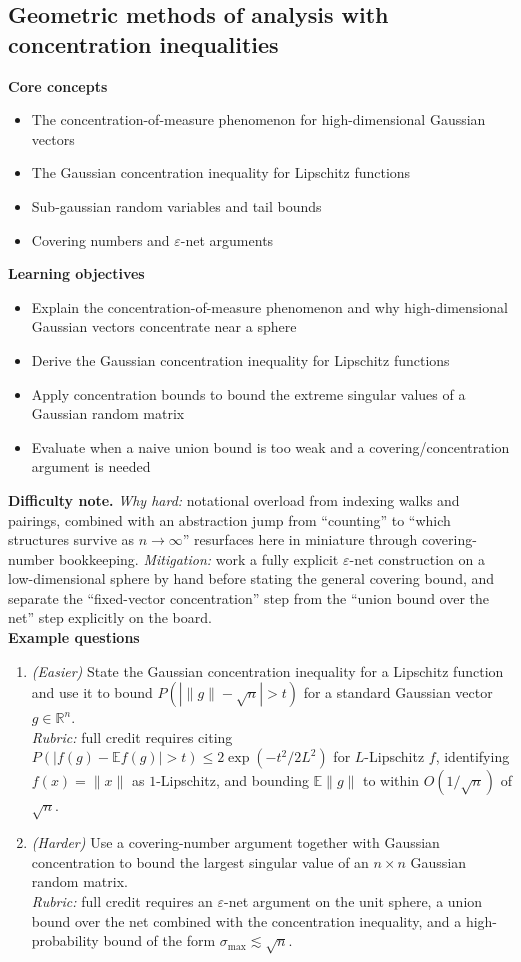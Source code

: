 \documentclass[11pt]{article}
\begin{document}
\subsection{Geometric methods of analysis with concentration inequalities}
\textbf{Core concepts}
\begin{itemize}[nosep]
\item The concentration-of-measure phenomenon for high-dimensional Gaussian vectors
\item The Gaussian concentration inequality for Lipschitz functions
\item Sub-gaussian random variables and tail bounds
\item Covering numbers and $\varepsilon$-net arguments
\end{itemize}
\textbf{Learning objectives}
\begin{itemize}[nosep]
\item Explain the concentration-of-measure phenomenon and why high-dimensional Gaussian vectors concentrate near a sphere
\item Derive the Gaussian concentration inequality for Lipschitz functions
\item Apply concentration bounds to bound the extreme singular values of a Gaussian random matrix
\item Evaluate when a naive union bound is too weak and a covering/concentration argument is needed
\end{itemize}
\textbf{Difficulty note.} \emph{Why hard:} notational overload from indexing walks and pairings, combined with an abstraction jump from ``counting'' to ``which structures survive as $n\to\infty$'' resurfaces here in miniature through covering-number bookkeeping. \emph{Mitigation:} work a fully explicit $\varepsilon$-net construction on a low-dimensional sphere by hand before stating the general covering bound, and separate the ``fixed-vector concentration'' step from the ``union bound over the net'' step explicitly on the board.\\[4pt]
\textbf{Example questions}
\begin{enumerate}[nosep]
\item \emph{(Easier)} State the Gaussian concentration inequality for a Lipschitz function and use it to bound $P(|\lVert g\rVert - \sqrt n| > t)$ for a standard Gaussian vector $g \in \mathbb{R}^n$. \\
\emph{Rubric:} full credit requires citing $P(|f(g)-\mathbb{E}f(g)|>t) \le 2\exp(-t^2/2L^2)$ for $L$-Lipschitz $f$, identifying $f(x)=\lVert x\rVert$ as $1$-Lipschitz, and bounding $\mathbb{E}\lVert g\rVert$ to within $O(1/\sqrt n)$ of $\sqrt n$.
\item \emph{(Harder)} Use a covering-number argument together with Gaussian concentration to bound the largest singular value of an $n\times n$ Gaussian random matrix. \\
\emph{Rubric:} full credit requires an $\varepsilon$-net argument on the unit sphere, a union bound over the net combined with the concentration inequality, and a high-probability bound of the form $\sigma_{\max} \lesssim \sqrt n$.
\end{enumerate}
\end{document}
